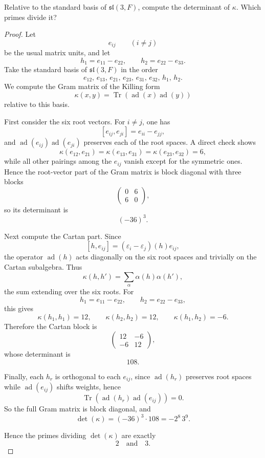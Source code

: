\begin{exercise}
    Relative to the standard basis of $\mathfrak{sl}(3,F)$, compute the determinant of $\kappa$. Which primes divide it?
\end{exercise}

\begin{proof}
    Let
    \[
        e_{ij}\qquad (i\neq j)
    \]
    be the usual matrix units, and let
    \[
        h_1=e_{11}-e_{22},\qquad h_2=e_{22}-e_{33}.
    \]
    Take the standard basis of $\mathfrak{sl}(3,F)$ in the order
    \[
        e_{12},\,e_{13},\,e_{21},\,e_{23},\,e_{31},\,e_{32},\,h_1,\,h_2.
    \]
    We compute the Gram matrix of the Killing form
    \[
        \kappa(x,y)=\operatorname{Tr}(\operatorname{ad}(x)\operatorname{ad}(y))
    \]
    relative to this basis.

    First consider the six root vectors. For $i\neq j$, one has
    \[
        [e_{ij},e_{ji}]=e_{ii}-e_{jj},
    \]
    and $\operatorname{ad}(e_{ij})\operatorname{ad}(e_{ji})$ preserves each of the root spaces. A direct check shows
    \[
        \kappa(e_{12},e_{21})=\kappa(e_{13},e_{31})=\kappa(e_{23},e_{32})=6,
    \]
    while all other pairings among the $e_{ij}$ vanish except for the symmetric ones. Hence the root-vector part of the Gram matrix is block diagonal with three blocks
    \[
        \begin{pmatrix}
            0 & 6 \\
            6 & 0
        \end{pmatrix},
    \]
    so its determinant is
    \[
        (-36)^3.
    \]

    Next compute the Cartan part. Since
    \[
        [h,e_{ij}]=(\varepsilon_i-\varepsilon_j)(h)e_{ij},
    \]
    the operator $\operatorname{ad}(h)$ acts diagonally on the six root spaces and trivially on the Cartan subalgebra. Thus
    \[
        \kappa(h,h')=\sum_{\alpha}\alpha(h)\alpha(h'),
    \]
    the sum extending over the six roots. For
    \[
        h_1=e_{11}-e_{22},\qquad h_2=e_{22}-e_{33},
    \]
    this gives
    \[
        \kappa(h_1,h_1)=12,\qquad
        \kappa(h_2,h_2)=12,\qquad
        \kappa(h_1,h_2)=-6.
    \]
    Therefore the Cartan block is
    \[
        \begin{pmatrix}
            12 & -6 \\
            -6 & 12
        \end{pmatrix},
    \]
    whose determinant is
    \[
        108.
    \]

    Finally, each $h_r$ is orthogonal to each $e_{ij}$, since $\operatorname{ad}(h_r)$ preserves root spaces while $\operatorname{ad}(e_{ij})$ shifts weights, hence
    \[
        \operatorname{Tr}(\operatorname{ad}(h_r)\operatorname{ad}(e_{ij}))=0.
    \]
    So the full Gram matrix is block diagonal, and
    \[
        \det(\kappa)=(-36)^3\cdot 108=-2^8\,3^9.
    \]

    Hence the primes dividing $\det(\kappa)$ are exactly
    \[
        2\quad\text{and}\quad 3.
    \]
\end{proof}

